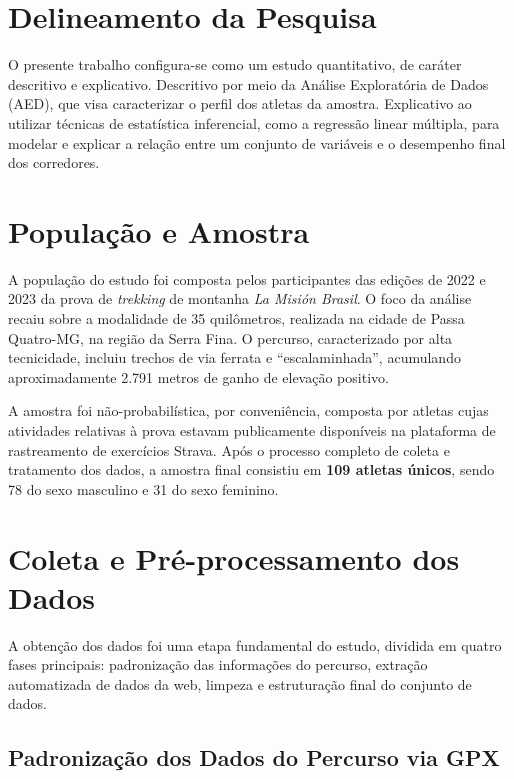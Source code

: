 \section{Delineamento da Pesquisa}

O presente trabalho configura-se como um estudo quantitativo, de caráter descritivo e explicativo. Descritivo por meio da Análise Exploratória de Dados (AED), que visa caracterizar o perfil dos atletas da amostra. Explicativo ao utilizar técnicas de estatística inferencial, como a regressão linear múltipla, para modelar e explicar a relação entre um conjunto de variáveis e o desempenho final dos corredores.

\section{População e Amostra}

A população do estudo foi composta pelos participantes das edições de 2022 e 2023 da prova de \emph{trekking} de montanha \textit{La Misión Brasil}. O foco da análise recaiu sobre a modalidade de 35 quilômetros, realizada na cidade de Passa Quatro-MG, na região da Serra Fina. O percurso, caracterizado por alta tecnicidade, incluiu trechos de via ferrata e ``escalaminhada'', acumulando aproximadamente 2.791 metros de ganho de elevação positivo.

A amostra foi não-probabilística, por conveniência, composta por atletas cujas atividades relativas à prova estavam publicamente disponíveis na plataforma de rastreamento de exercícios Strava. Após o processo completo de coleta e tratamento dos dados, a amostra final consistiu em \textbf{109 atletas únicos}, sendo 78 do sexo masculino e 31 do sexo feminino.

\section{Coleta e Pré-processamento dos Dados}

A obtenção dos dados foi uma etapa fundamental do estudo, dividida em quatro fases principais: padronização das informações do percurso, extração automatizada de dados da web, limpeza e estruturação final do conjunto de dados.

\subsection{Padronização dos Dados do Percurso via GPX}
\label{subsec:gpx}

